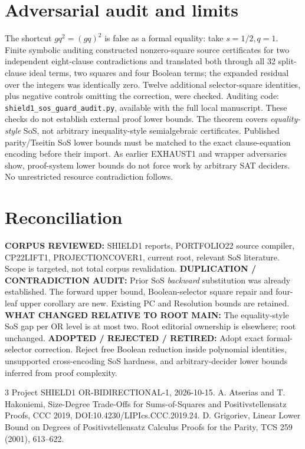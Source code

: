 \documentclass[11pt]{article}
\begin{document}
\section{Adversarial audit and limits}
The shortcut $gq^2=(gq)^2$ is false as a formal equality: take $s=1/2,q=1$. Finite symbolic auditing constructed nonzero-square source certificates for two independent eight-clause contradictions and translated both through all 32 split-clause ideal terms, two squares and four Boolean terms; the expanded residual over the integers was identically zero. Twelve additional selector-square identities, plus negative controls omitting the correction, were checked. Auditing code: \texttt{shield1\_sos\_guard\_audit.py}, available with the full local manuscript. These checks do not establish external proof lower bounds. The theorem covers \emph{equality-style} SoS, not arbitrary inequality-style semialgebraic certificates. Published parity/Tseitin SoS lower bounds must be matched to the exact clause-equation encoding before their import. As earlier EXHAUST1 and wrapper adversaries show, proof-system lower bounds do not force work by arbitrary SAT deciders. No unrestricted resource contradiction follows.
\section{Reconciliation}
\noindent\textbf{CORPUS REVIEWED:} SHIELD1 reports, PORTFOLIO22 source compiler, CP22LIFT1, PROJECTIONCOVER1, current root, relevant SoS literature. Scope is targeted, not total corpus revalidation.
\noindent\textbf{DUPLICATION / CONTRADICTION AUDIT:} Prior SoS \emph{backward} substitution was already established. The forward upper bound, Boolean-selector square repair and four-leaf upper corollary are new. Existing PC and Resolution bounds are retained.
\noindent\textbf{WHAT CHANGED RELATIVE TO ROOT MAIN:} The equality-style SoS gap per OR level is at most two. Root editorial ownership is elsewhere; root unchanged.
\noindent\textbf{ADOPTED / REJECTED / RETIRED:} Adopt exact formal-selector correction. Reject free Boolean reduction inside polynomial identities, unsupported cross-encoding SoS hardness, and arbitrary-decider lower bounds inferred from proof complexity.
\begin{thebibliography}{3}
 Project SHIELD1 OR-BIDIRECTIONAL-1, 2026-10-15.
 A. Atserias and T. Hakoniemi, Size-Degree Trade-Offs for Sums-of-Squares and Positivstellensatz Proofs, CCC 2019, DOI:10.4230/LIPIcs.CCC.2019.24.
 D. Grigoriev, Linear Lower Bound on Degrees of Positivstellensatz Calculus Proofs for the Parity, TCS 259 (2001), 613--622.
\end{thebibliography}
\end{document}
